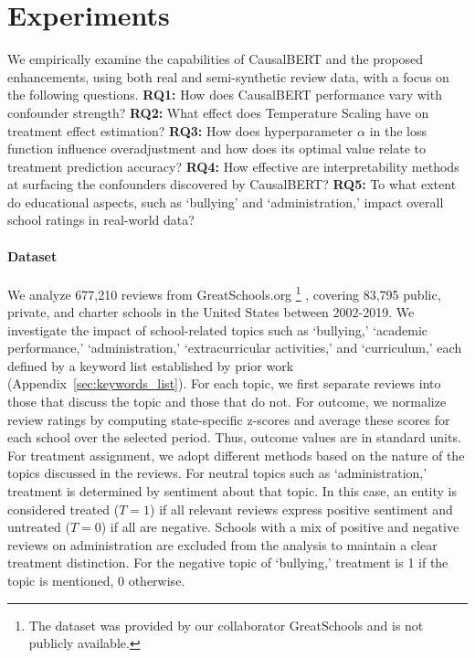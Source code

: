 \documentclass[11pt]{article}
\begin{document}
\section{Experiments}
\label{sec:experiments}
We empirically examine the capabilities of CausalBERT and the proposed enhancements, using both real and semi-synthetic review data, with a focus on the following questions.
%
\textbf{RQ1:} How does CausalBERT performance vary with confounder strength? \textbf{RQ2:} What effect does Temperature Scaling have on treatment effect estimation? \textbf{RQ3:} How does hyperparameter \( \alpha \) in the loss function influence  overadjustment and how does its optimal value relate to treatment prediction accuracy? \textbf{RQ4:} How effective are interpretability methods at surfacing the confounders discovered by CausalBERT? \textbf{RQ5:} To what extent do educational aspects, such as `bullying' and `administration,' impact overall school ratings in real-world data? 

\vspace{-.1cm}

\paragraph{Dataset}
\label{sec:Dataset}
We analyze 677,210 reviews from GreatSchools.org \footnote{The dataset was provided by our collaborator GreatSchools and is not publicly available.} , covering 83,795 public, private, and charter schools in the United States between 2002-2019. 
We investigate the impact of school-related topics such as `bullying,' `academic performance,' `administration,' `extracurricular activities,' and `curriculum,' each defined by a keyword list established by prior work~\cite{harris2022,gillani2021parents} (Appendix~\ref{sec:keywords_list}). For each topic, we first separate reviews into those that discuss the topic and those that do not.
For outcome, we normalize review ratings by computing state-specific z-scores and average these scores for each school over the selected period. Thus, outcome values are in standard units. For treatment assignment, we adopt different methods based on the nature of the topics discussed in the reviews. For neutral topics such as `administration,' treatment is determined by sentiment about that topic. In this case, an entity is considered treated ($T=1$) if all relevant reviews express positive sentiment and untreated ($T=0$) if all are negative. Schools with a mix of positive and negative reviews on administration are excluded from the analysis to maintain a clear treatment distinction. For the negative topic of `bullying,' treatment is  1 if the topic is mentioned, 0 otherwise.
\end{document}

